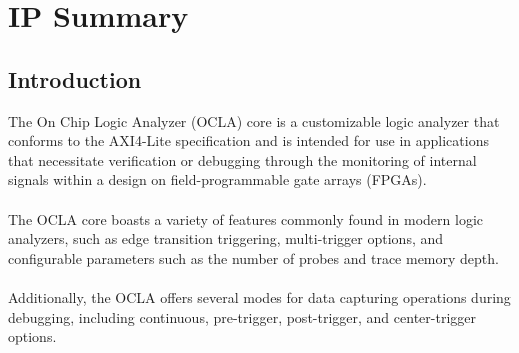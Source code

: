\documentclass[phv, 11pt ]{SelfArx} %
\begin{document}
{\newpage
\section*{\hfill \fontsize{24}{28}\selectfont IP Summary}

	\subsection*{\fontsize{14}{16}\selectfont Introduction}
	The On Chip Logic Analyzer (OCLA) core is a customizable logic analyzer that conforms to the AXI4-Lite specification and is intended for use in applications that necessitate verification or debugging through the monitoring of internal signals within a design on field-programmable gate arrays (FPGAs). 
	\\ \\The OCLA core boasts a variety of features commonly found in modern logic analyzers, such as edge transition triggering, multi-trigger options, and configurable parameters such as the number of probes and trace memory depth. 
	\\ \\Additionally, the OCLA offers several modes for data capturing operations during debugging, including continuous, pre-trigger, post-trigger, and center-trigger options.
	\noindent

}
\end{document}
